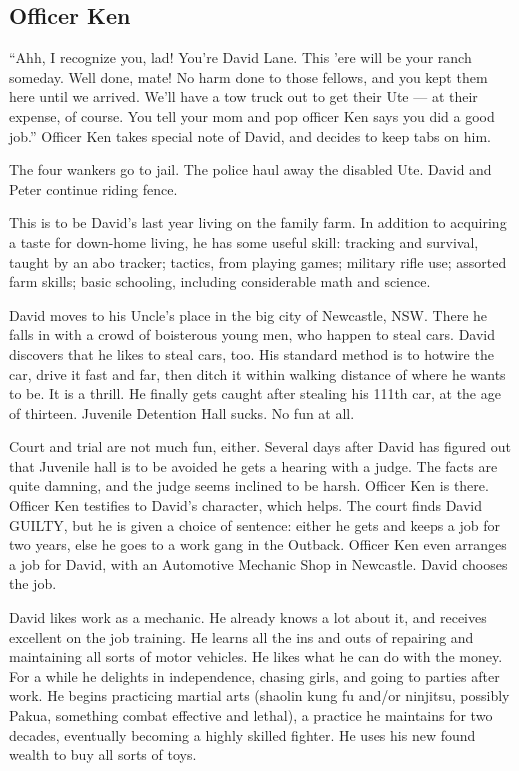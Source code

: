 \subsection*{Officer Ken}
\label{pos03:officer-ken}

``Ahh, I recognize you, lad!  You're David Lane.  This 'ere will be your ranch someday.  Well done, mate!  No harm done to those fellows, and you kept them here until we arrived.  We'll have a tow truck out to get their Ute --- at their expense, of course.  You tell your mom and pop officer Ken says you did a good job.''  Officer Ken takes special note of David, and decides to keep tabs on him.

The four wankers go to jail.  The police haul away the disabled Ute.  David and Peter continue riding fence.

This is to be David's last year living on the family farm.  In addition to acquiring a taste for down-home living, he has some useful skill: tracking and survival, taught by an abo tracker; tactics, from playing games; military rifle use; assorted farm skills; basic schooling, including considerable math and science.

David moves to his Uncle's place in the big city of Newcastle, NSW\@. There he falls in with a crowd of boisterous young men, who happen to steal cars.  David discovers that he likes to steal cars, too.  His standard method is to hotwire the car, drive it fast and far, then ditch it within walking distance of where he wants to be.  It is a thrill.  He finally gets caught after stealing his 111th car, at the age of thirteen.  Juvenile Detention Hall sucks.  No fun at all.

Court and trial are not much fun, either.  Several days after David has figured out that Juvenile hall is to be avoided he gets a hearing with a judge.  The facts are quite damning, and the judge seems inclined to be harsh.  Officer Ken is there.  Officer Ken testifies to David's character, which helps. The court finds David GUILTY, but he is given a choice of sentence: either he gets and keeps a job for two years, else he goes to a work gang in the Outback.  Officer Ken even arranges a job for David, with an Automotive Mechanic Shop in Newcastle.  David chooses the job.

David likes work as a mechanic.  He already knows a lot about it, and receives excellent on the job training.  He learns all the ins and outs of repairing and maintaining all sorts of motor vehicles.  He likes what he can do with the money.   For a while he delights in independence, chasing girls, and going to parties after work.  He begins practicing martial arts (shaolin kung fu and/or ninjitsu, possibly Pakua, something combat effective and lethal), a practice he maintains for two decades, eventually becoming a highly skilled fighter.   He uses his new found wealth to buy all sorts of toys.

